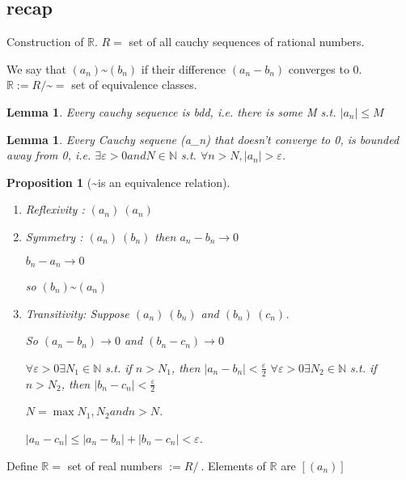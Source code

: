 \documentclass[twoside]{article}
\newcommand{\N}{\mathbb{N}}
\newtheorem{lemma}[theorem]{Lemma}
\newtheorem{proposition}[theorem]{Proposition}
\newcommand\R{\mathbb{R}}
\begin{document}
\subsection{recap}

Construction of $\R$.
$R = $ set of all cauchy sequences of rational numbers. 

We say that $(a_n) \text{\textasciitilde} (b_n)$ if their difference $(a_n - b_n)$ converges to 0. 
$\R := R/\text{\textasciitilde}  =$ set of equivalence classes.

\begin{lemma}
    Every cauchy sequence is bdd, i.e. there is some M s.t. $|a_n| \leq M$     
\end{lemma}

\begin{lemma}
    Every Cauchy sequene (a_n) that doesn't converge to 0, is bounded away from 0, i.e. $\exists \varepsilon > 0 and N \in \N$ s.t. $\forall n > N, |a_n|>\varepsilon$. 
\end{lemma}

\begin{proposition}[\textasciitilde is an equivalence relation]

    \begin{enumerate}
        \item Reflexivity : $(a_n) ~ (a_n)$
        \item Symmetry :         $(a_n) ~ (b_n)$ then $a_n - b_n \rightarrow 0$

        $b_n - a_n \rightarrow 0$

        so $(b_n) \text{\textasciitilde} (a_n)$
        \item Transitivity: Suppose $(a_n) ~ (b_n)$ and $(b_n) ~ (c_n)$. 

        So $(a_n - b_n) \rightarrow 0$ and $(b_n - c_n) \rightarrow 0$

        $\forall \varepsilon > 0 \exists N_1 \in \N$ s.t. if $n > N_1$, then $|a_n - b_n| < \frac{\varepsilon}{2}$
        $\forall \varepsilon > 0 \exists N_2 \in \N$ s.t. if $n > N_2$, then $|b_n - c_n| < \frac{\varepsilon}{2}$

        $N = \max{N_1,N_2} and n > N$. 

        $|a_n - c_n| \leq |a_n-b_n| + |b_n - c_n| < \varepsilon$. 
    \end{enumerate}

\end{proposition}

Define $\R = $ set of real numbers $:= R/~$. Elements of $\R$ are $[(a_n)]$
\end{document}
